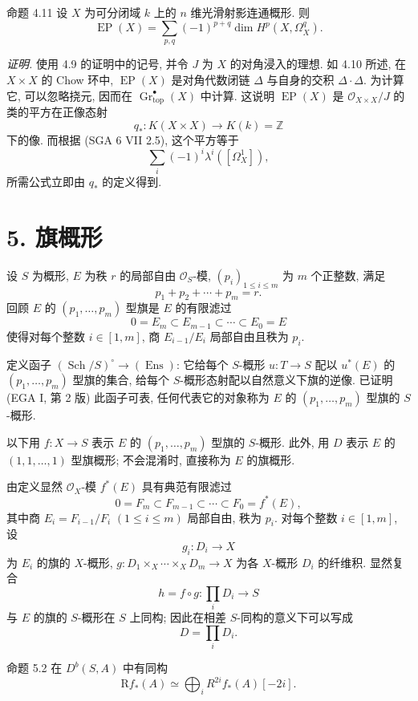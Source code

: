 \begin{statement}{命题 4.11}
设 $X$ 为可分闭域 $k$ 上的 $n$ 维光滑射影连通概形. 则
\[
\operatorname{EP}(X)=\sum_{p,q}(-1)^{p+q}\dim H^p(X,\Omega_X^q).
\]
\end{statement}

\emph{证明.} 使用 4.9 的证明中的记号, 并令 $J$ 为 $X$ 的对角浸入的理想. 如 4.10 所述, 在 $X\times X$ 的 Chow 环中, $\operatorname{EP}(X)$ 是对角代数闭链 $\Delta$ 与自身的交积 $\Delta\cdot\Delta$. 为计算它, 可以忽略挠元, 因而在 $\operatorname{Gr}_{\mathrm{top}}^\bullet(X)$ 中计算. 这说明 $\operatorname{EP}(X)$ 是 $\mathcal O_{X\times X}/J$ 的类的平方在正像态射
\[
q_*:K(X\times X)\to K(k)=\mathbb Z
\]
下的像. 而根据 (SGA 6 VII 2.5), 这个平方等于
\[
\sum_i(-1)^i\lambda^i([\Omega_X^1]),
\]
所需公式立即由 $q_*$ 的定义得到.

\section*{5. 旗概形}

设 $S$ 为概形, $E$ 为秩 $r$ 的局部自由 $\mathcal O_S$-模, $(p_i)_{1\le i\le m}$ 为 $m$ 个正整数, 满足
\[
p_1+p_2+\cdots+p_m=r.
\]
回顾 $E$ 的 $(p_1,\ldots,p_m)$ 型旗是 $E$ 的有限滤过
\[
0=E_m\subset E_{m-1}\subset\cdots\subset E_0=E
\]
使得对每个整数 $i\in[1,m]$, 商 $E_{i-1}/E_i$ 局部自由且秩为 $p_i$.

定义函子 $(\operatorname{Sch}/S)^\circ\to(\operatorname{Ens})$: 它给每个 $S$-概形 $u:T\to S$ 配以 $u^*(E)$ 的 $(p_1,\ldots,p_m)$ 型旗的集合, 给每个 $S$-概形态射配以自然意义下旗的逆像. 已证明 (EGA I, 第 2 版) 此函子可表, 任何代表它的对象称为 $E$ 的 $(p_1,\ldots,p_m)$ 型旗的 $S$-概形.

以下用 $f:X\to S$ 表示 $E$ 的 $(p_1,\ldots,p_m)$ 型旗的 $S$-概形. 此外, 用 $D$ 表示 $E$ 的 $(1,1,\ldots,1)$ 型旗概形; 不会混淆时, 直接称为 $E$ 的旗概形.

由定义显然 $\mathcal O_X$-模 $f^*(E)$ 具有典范有限滤过
\[
0=F_m\subset F_{m-1}\subset\cdots\subset F_0=f^*(E),
\]
其中商 $E_i=F_{i-1}/F_i$ $(1\le i\le m)$ 局部自由, 秩为 $p_i$. 对每个整数 $i\in[1,m]$, 设
\[
g_i:D_i\to X
\]
为 $E_i$ 的旗的 $X$-概形, $g:D_1\times_X\cdots\times_X D_m\to X$ 为各 $X$-概形 $D_i$ 的纤维积. 显然复合
\[
h=f\circ g:\prod_iD_i\to S
\tag{5.1}
\]
与 $E$ 的旗的 $S$-概形在 $S$ 上同构; 因此在相差 $S$-同构的意义下可以写成
\[
D=\prod_iD_i.
\]

\begin{statement}{命题 5.2}
在 $D^b(S,A)$ 中有同构
\[
\mathrm Rf_*(A)\simeq\bigoplus_i R^{2i}f_*(A)[-2i].
\]
\end{statement}

